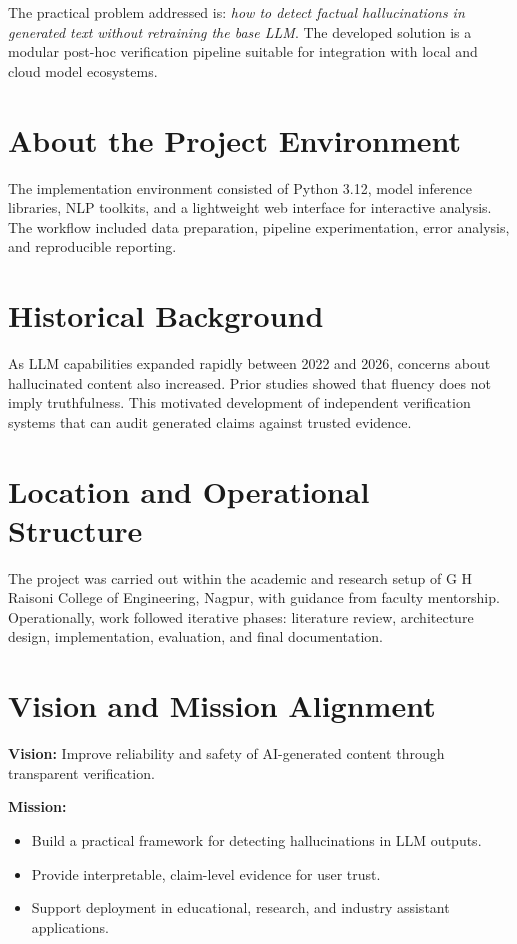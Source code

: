 \documentclass[12pt,a4paper]{report}
\begin{document}
The practical problem addressed is: \textit{how to detect factual hallucinations in generated text
without retraining the base LLM}. The developed solution is a modular post-hoc verification pipeline
suitable for integration with local and cloud model ecosystems.

\section{About the Project Environment}
The implementation environment consisted of Python 3.12, model inference libraries,
NLP toolkits, and a lightweight web interface for interactive analysis.
The workflow included data preparation, pipeline experimentation,
error analysis, and reproducible reporting.

\section{Historical Background}
As LLM capabilities expanded rapidly between 2022 and 2026,
concerns about hallucinated content also increased. Prior studies showed that fluency does not imply truthfulness.
This motivated development of independent verification systems that can audit generated claims against trusted evidence.

\section{Location and Operational Structure}
The project was carried out within the academic and research setup of
G H Raisoni College of Engineering, Nagpur, with guidance from faculty mentorship.
Operationally, work followed iterative phases: literature review, architecture design,
implementation, evaluation, and final documentation.

\section{Vision and Mission Alignment}
\textbf{Vision:} Improve reliability and safety of AI-generated content through transparent verification.

\textbf{Mission:}
\begin{itemize}[leftmargin=1.5em]
\item Build a practical framework for detecting hallucinations in LLM outputs.
\item Provide interpretable, claim-level evidence for user trust.
\item Support deployment in educational, research, and industry assistant applications.
\end{itemize}
\end{document}
